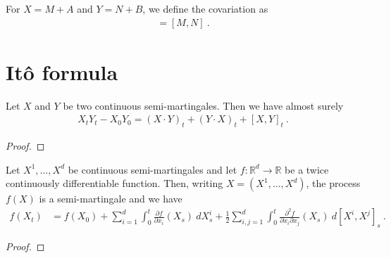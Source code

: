 For $X = M + A$ and $Y = N + B$, we define the covariation as
\begin{align*}
  [X, Y] = [M, N]
  \: .
\end{align*}

\section{Itô formula}


\begin{theorem}\label{thm:integration_by_parts}
Let $X$ and $Y$ be two continuous semi-martingales. Then we have almost surely
\begin{align*}
  X_t Y_t - X_0 Y_0
  = (X \cdot Y)_t + (Y \cdot X)_t + [X,Y]_t
  \: .
\end{align*}
\end{theorem}

\begin{proof}

\end{proof}


\begin{theorem}\label{thm:Ito_formula}
Let $X^1, \ldots, X^d$ be continuous semi-martingales and let $f : \mathbb{R}^d \to \mathbb{R}$ be a twice continuously differentiable function.
Then, writing $X = (X^1, \ldots, X^d)$, the process $f(X)$ is a semi-martingale and we have
\begin{align*}
  f(X_t)
  &= f(X_0)
  + \sum_{i=1}^d \int_0^t \frac{\partial f}{\partial x_i}(X_s) \: dX^i_s
  + \frac{1}{2} \sum_{i,j=1}^d \int_0^t \frac{\partial^2 f}{\partial x_i \partial x_j}(X_s) \: d[X^i, X^j]_s
  \: .
\end{align*}
\end{theorem}

\begin{proof}

\end{proof}
